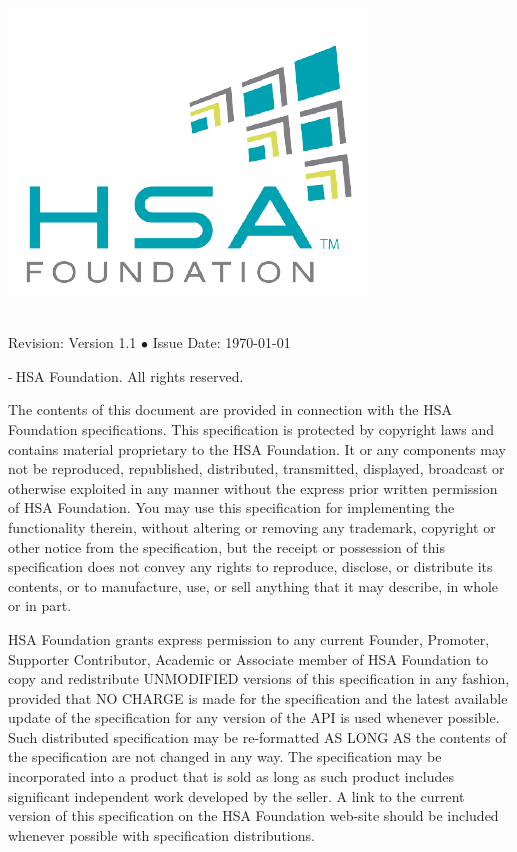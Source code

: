 \documentclass[final,oneside]{book}
\newcommand{\doctitle}{HSA Runtime Programmer's Reference Manual}
\begin{document}
\providecommand{\DIFadd}[1]{{\protect\color{Green}#1}}
\renewcommand{\DIFadd}[1]{{\protect\color{Green}#1}}

\providecommand{\DIFdel}[1]{{\protect\color{red}\sout{\mbox{#1}}}}
\renewcommand{\DIFdel}[1]{{\protect\color{red}\sout{\mbox{#1}}}}

\begin{titlepage}
\includegraphics[width=.3\textwidth]{fig/foundation.png}
\vspace*{7cm}
\begin{center}
{\Huge \color{Cerulean}{\doctitle}\\[7cm]}
{\small Revision: Version 1.1 $\bullet$ Issue Date: \today}\\ \end{center}
\end{titlepage}
\thispagestyle{empty} {-\the\year $\:$HSA Foundation. All rights
  reserved.}


The contents of this document are provided in connection with the HSA Foundation
specifications. This specification is protected by copyright laws and contains
material proprietary to the HSA Foundation. It or any components may not be
reproduced, republished, distributed, transmitted, displayed, broadcast or
otherwise exploited in any manner without the express prior written permission
of HSA Foundation. You may use this specification for implementing the
functionality therein, without altering or removing any trademark, copyright or
other notice from the specification, but the receipt or possession of this
specification does not convey any rights to reproduce, disclose, or distribute
its contents, or to manufacture, use, or sell anything that it may describe, in
whole or in part.

HSA Foundation grants express permission to any current Founder, Promoter,
Supporter Contributor, Academic or Associate member of HSA Foundation to copy
and redistribute UNMODIFIED versions of this specification in any fashion,
provided that NO CHARGE is made for the specification and the latest available
update of the specification for any version of the API is used whenever
possible. Such distributed specification may be re-formatted AS LONG AS the
contents of the specification are not changed in any way. The specification may
be incorporated into a product that is sold as long as such product includes
significant independent work developed by the seller. A link to the current
version of this specification on the HSA Foundation web-site should be included
whenever possible with specification distributions.
\end{document}
